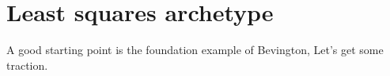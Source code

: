 \chapter{Least squares archetype}

A good starting point is the foundation example of Bevington,
Let's get some traction.


\endinput  %